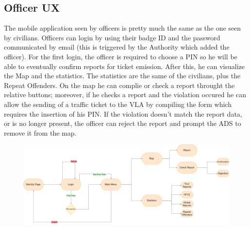 \documentclass[12pt,a4paper]{article}
\begin{document}
\subsection{Officer UX}
The mobile application seen by officers is pretty much the same as the one seen by civilians. Officers can login by using their badge ID and the password communicated by email (this is triggered by the Authority which added the officer). For the first login, the officer is required to choose a PIN so he will be able to eventually confirm reports for ticket emission. After this, he can visualize the Map and the statistics. The statistics are the same of the civilians, plus the Repeat Offenders. On the map he can complie or check a report throught the relative buttons; moreover, if he checks a report and the violation occured he can allow the sending of a traffic ticket to the VLA by compiling the form which requires the insertion of his PIN. If the violation doesn't match the report data, or is no longer present, the officer can reject the report and prompt the ADS to remove it from the map.
\begin{figure}[H]
		\centering
\begin{adjustwidth}{-25mm}{-25mm}
					        \includegraphics[width=1\linewidth]{Images/UX/OfficerUX}
					\end{adjustwidth}		
	
\end{figure}
\newpage
\end{document}
